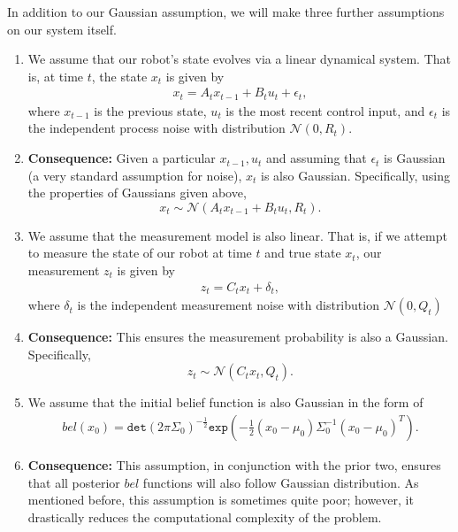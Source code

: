 \documentclass[twoside]{article}
\begin{document}
\par
In addition to our Gaussian assumption, we will make three further assumptions on our system itself.
\begin{enumerate}
    \item
    We assume that our robot's state evolves via a linear dynamical system. That is, at time $t$, the state $x_t$ is given by
    \begin{align*}
    x_t = A_t x_{t-1} + B_t u_t + \epsilon_{t},
    \end{align*}
    where $x_{t-1}$ is the previous state, $u_t$ is the most recent control input, and $\epsilon_{t}$ is the independent process noise with distribution $\mathcal{N}(0,R_t)$.
    \item[] {\bf Consequence:}
    Given a particular $x_{t-1},u_t$ and assuming that $\epsilon_t$ is Gaussian (a very standard assumption for noise), $x_t$ is also Gaussian. Specifically, using the properties of Gaussians given above, $$x_t \sim \mathcal{N}(A_t x_{t-1} + B_t u_t, R_t).$$
    
    \item
    We assume that the measurement model is also linear. That is, if we attempt to measure the state of our robot at time $t$ and true state $x_t$, our measurement $z_t$ is given by
    \begin{align*}
    z_t = C_t x_t + \delta_t,
    \end{align*}
    where $\delta_t$ is the independent measurement noise with distribution $\mathcal{N}(0,Q_t)$
    \item[] {\bf Consequence:}
    This ensures the measurement probability is also a Gaussian. Specifically, $$z_t \sim \mathcal{N}(C_t x_t, Q_t).$$
    
    \item
    We assume that the initial belief function is also Gaussian in the form of \begin{align*}
    bel(x_0) = \mathtt{det}(2\pi\Sigma_0)^{-\frac{1}{2}}\mathtt{exp}(-\frac{1}{2}(x_0-\mu_0)\Sigma_0^{-1}(x_0-\mu_0)^{T}).
    \end{align*}
    \item[] {\bf Consequence:} 
    This assumption, in conjunction with the prior two, ensures that all posterior $bel$ functions will also follow Gaussian distribution. As mentioned before, this assumption is sometimes quite poor; however, it drastically reduces the computational complexity of the problem.
\end{enumerate}
\end{document}

